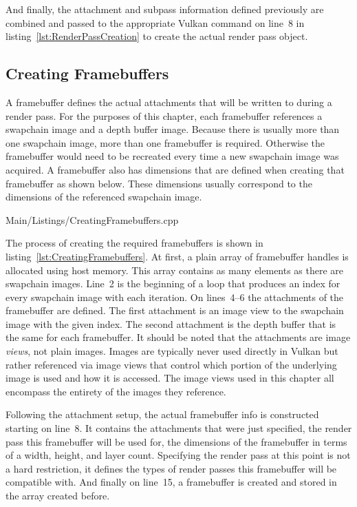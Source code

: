         And finally, the attachment and subpass information defined previously are combined and passed to the appropriate Vulkan command on line~8 in listing~\ref{lst:RenderPassCreation} to create the actual render pass object.

      \subsection{Creating Framebuffers}
      \label{subsec:CreatingFramebuffers}
        A framebuffer defines the actual attachments that will be written to during a render pass.
        For the purposes of this chapter, each framebuffer references a swapchain image and a depth buffer image.
        Because there is usually more than one swapchain image, more than one framebuffer is required.
        Otherwise the framebuffer would need to be recreated every time a new swapchain image was acquired.
        A framebuffer also has dimensions that are defined when creating that framebuffer as shown below.
        These dimensions usually correspond to the dimensions of the referenced swapchain image.

        
        {Main/Listings/CreatingFramebuffers.cpp}

        The process of creating the required framebuffers is shown in listing~\ref{lst:CreatingFramebuffers}.
        At first, a plain array of framebuffer handles is allocated using host memory.
        This array contains as many elements as there are swapchain images.
        Line~2 is the beginning of a loop that produces an index for every swapchain image with each iteration.
        On lines~4--6 the attachments of the framebuffer are defined.
        The first attachment is an image view to the swapchain image with the given index.
        The second attachment is the depth buffer that is the same for each framebuffer.
        It should be noted that the attachments are image \textit{views}, not plain images.
        Images are typically never used directly in Vulkan but rather referenced via image views that control which portion of the underlying image is used and how it is accessed.
        The image views used in this chapter all encompass the entirety of the images they reference.

        Following the attachment setup, the actual framebuffer info is constructed starting on line~8.
        It contains the attachments that were just specified, the render pass this framebuffer will be used for, the dimensions of the framebuffer in terms of a width, height, and layer count.
        Specifying the render pass at this point is not a hard restriction, it defines the types of render passes this framebuffer will be compatible with.
        And finally on line~15, a framebuffer is created and stored in the array created before.

